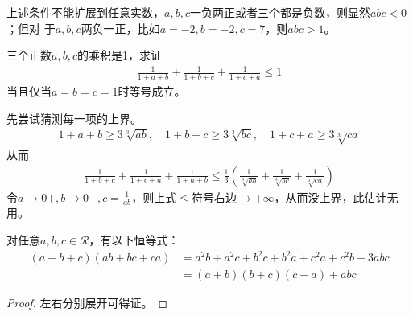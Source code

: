 上述条件不能扩展到任意实数，$a,b,c$一负两正或者三个都是负数，则显然$abc<0$；但对
于$a,b,c$两负一正，比如$a=-2,b=-2,c=7$，则$abc>1$。



\begin{question}\label{q:1/1+a+b}
  三个正数$a,b,c$的乘积是1，求证
  \begin{align*}
    \frac1{1+a+b} + \frac1{1+b+c} + \frac1{1+c+a} \le 1
  \end{align*}
  当且仅当$a=b=c=1$时等号成立。
\end{question}

先尝试猜测每一项的上界。
\begin{align*}
  1+a+b\ge 3\sqrt[3]{ab},\quad 1+b+c \ge 3\sqrt[3]{bc},\quad 1+c+a\ge 3\sqrt[3]{ca}
\end{align*}
从而
\begin{align*}
  \frac1{1+b+c} + \frac1{1+c+a} + \frac1{1+a+b} \le
  \frac13\left( \frac1{\sqrt[3]{ab}} + \frac1{\sqrt[3]{bc}} + \frac1{\sqrt[3]{ca}} \right)
\end{align*}
令$a\to0+, b\to 0+, c=\frac1{ab}$，则上式$\le$符号右边$\to+\infty$，从而没上界，此估计无用。




\begin{lemma}
对任意$a,b,c\in\mathcal{R}$，有以下恒等式：
\begin{align*}
  (a+b+c)(ab+bc+ca)&=a^2b+a^2c+b^2c+b^2a+c^2a+c^2b + 3abc\\
                   &=(a+b)(b+c)(c+a)+abc
\end{align*}
\end{lemma}
\begin{proof}
  左右分别展开可得证。
\end{proof}

